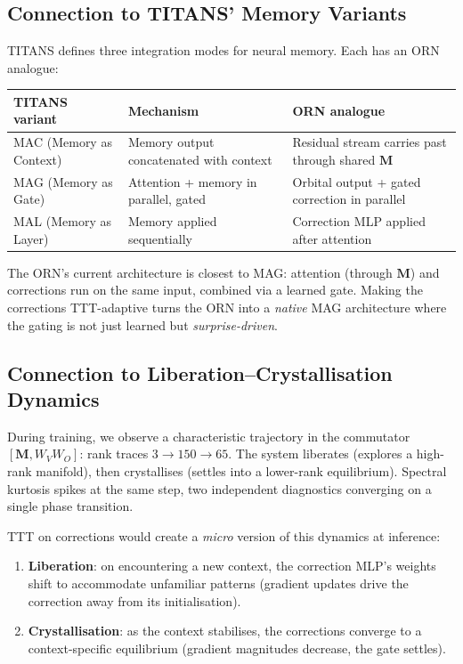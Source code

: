 \documentclass[11pt, a4paper]{article}
\newcommand{\M}{\mathbf{M}}
\theoremstyle{plain}
\theoremstyle{definition}
\theoremstyle{remark}
\begin{document}
\subsection{Connection to TITANS' Memory Variants}

TITANS defines three integration modes for neural memory.
Each has an ORN analogue:

\begin{center}\small
\begin{tabular}{lll}
\toprule
\textbf{TITANS variant} & \textbf{Mechanism} & \textbf{ORN analogue} \\
\midrule
MAC (Memory as Context) & Memory output concatenated with context & Residual stream carries past through shared $\M$ \\
MAG (Memory as Gate) & Attention + memory in parallel, gated & Orbital output + gated correction in parallel \\
MAL (Memory as Layer) & Memory applied sequentially & Correction MLP applied after attention \\
\bottomrule
\end{tabular}
\end{center}

The ORN's current architecture is closest to MAG: attention (through $\M$) and corrections run on the same input, combined via a learned gate.
Making the corrections TTT-adaptive turns the ORN into a \emph{native} MAG architecture where the gating is not just learned but \emph{surprise-driven}.

\subsection{Connection to Liberation--Crystallisation Dynamics}

During training, we observe a characteristic trajectory in the commutator $[\M, W_V W_O]$: rank traces $3 \to 150 \to 65$.
The system liberates (explores a high-rank manifold), then crystallises (settles into a lower-rank equilibrium).
Spectral kurtosis spikes at the same step, two independent diagnostics converging on a single phase transition.

TTT on corrections would create a \emph{micro} version of this dynamics at inference:
\begin{enumerate}[nosep]
\item \textbf{Liberation}: on encountering a new context, the correction MLP's weights shift to accommodate unfamiliar patterns (gradient updates drive the correction away from its initialisation).
\item \textbf{Crystallisation}: as the context stabilises, the corrections converge to a context-specific equilibrium (gradient magnitudes decrease, the gate settles).
\end{enumerate}
\end{document}
